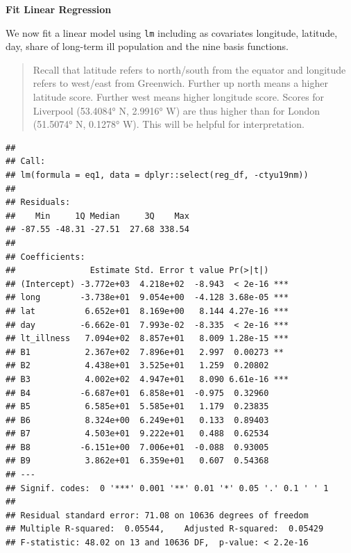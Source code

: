 \documentclass[
]{book}
\newenvironment{Shaded}{\begin{snugshade}}{\end{snugshade}}
\newcommand{\DataTypeTok}[1]{\textcolor[rgb]{0.13,0.29,0.53}{#1}}
\newcommand{\KeywordTok}[1]{\textcolor[rgb]{0.13,0.29,0.53}{\textbf{#1}}}
\newcommand{\NormalTok}[1]{#1}
\newcommand{\OperatorTok}[1]{\textcolor[rgb]{0.81,0.36,0.00}{\textbf{#1}}}
\newcommand{\StringTok}[1]{\textcolor[rgb]{0.31,0.60,0.02}{#1}}
\begin{document}
\textbf{Fit Linear Regression}

We now fit a linear model using \texttt{lm} including as covariates longitude, latitude, day, share of long-term ill population and the nine basis functions.

\begin{quote}
Recall that latitude refers to north/south from the equator and longitude refers to west/east from Greenwich. Further up north means a higher latitude score. Further west means higher longitude score. Scores for Liverpool (53.4084° N, 2.9916° W) are thus higher than for London (51.5074° N, 0.1278° W). This will be helpful for interpretation.
\end{quote}

\begin{Shaded}
\end{Shaded}

\begin{verbatim}
## 
## Call:
## lm(formula = eq1, data = dplyr::select(reg_df, -ctyu19nm))
## 
## Residuals:
##    Min     1Q Median     3Q    Max 
## -87.55 -48.31 -27.51  27.68 338.54 
## 
## Coefficients:
##               Estimate Std. Error t value Pr(>|t|)    
## (Intercept) -3.772e+03  4.218e+02  -8.943  < 2e-16 ***
## long        -3.738e+01  9.054e+00  -4.128 3.68e-05 ***
## lat          6.652e+01  8.169e+00   8.144 4.27e-16 ***
## day         -6.662e-01  7.993e-02  -8.335  < 2e-16 ***
## lt_illness   7.094e+02  8.857e+01   8.009 1.28e-15 ***
## B1           2.367e+02  7.896e+01   2.997  0.00273 ** 
## B2           4.438e+01  3.525e+01   1.259  0.20802    
## B3           4.002e+02  4.947e+01   8.090 6.61e-16 ***
## B4          -6.687e+01  6.858e+01  -0.975  0.32960    
## B5           6.585e+01  5.585e+01   1.179  0.23835    
## B6           8.324e+00  6.249e+01   0.133  0.89403    
## B7           4.503e+01  9.222e+01   0.488  0.62534    
## B8          -6.151e+00  7.006e+01  -0.088  0.93005    
## B9           3.862e+01  6.359e+01   0.607  0.54368    
## ---
## Signif. codes:  0 '***' 0.001 '**' 0.01 '*' 0.05 '.' 0.1 ' ' 1
## 
## Residual standard error: 71.08 on 10636 degrees of freedom
## Multiple R-squared:  0.05544,    Adjusted R-squared:  0.05429 
## F-statistic: 48.02 on 13 and 10636 DF,  p-value: < 2.2e-16
\end{verbatim}
\end{document}
